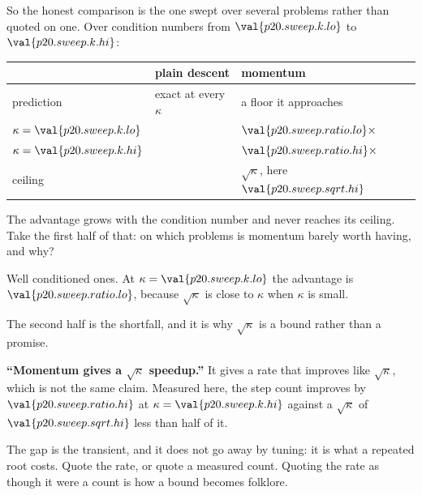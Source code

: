 \begin{fr}
So the honest comparison is the one swept over several problems rather than
quoted on one. Over condition numbers from $\val{p20.sweep.k.lo}$ to
$\val{p20.sweep.k.hi}$:

\begin{center}
\begin{tabular}{lll}
\toprule
& plain descent & momentum \\
\midrule
prediction & exact at every $\kappa$ & a floor it approaches \\
$\kappa = \val{p20.sweep.k.lo}$ & \dash{} & $\val{p20.sweep.ratio.lo}\times$ \\
$\kappa = \val{p20.sweep.k.hi}$ & \dash{} & $\val{p20.sweep.ratio.hi}\times$ \\
ceiling & \dash{} & $\sqrt{\kappa}$, here $\val{p20.sweep.sqrt.hi}$ \\
\bottomrule
\end{tabular}
\end{center}

The advantage grows with the condition number and never reaches its ceiling.
Take the first half of that: on which problems is momentum barely worth
having, and why?
\nextframe
\end{fr}

\begin{fr}
\begin{ansblock}
Well conditioned ones. At $\kappa = \val{p20.sweep.k.lo}$ the advantage is
$\val{p20.sweep.ratio.lo}$, because $\sqrt{\kappa}$ is close to $\kappa$ when
$\kappa$ is small.
\end{ansblock}

The second half is the shortfall, and it is why $\sqrt{\kappa}$ is a bound
rather than a promise.

\begin{trapbox}
\textbf{\enquote{Momentum gives a $\sqrt{\kappa}$ speedup.}} It gives a rate
that improves like $\sqrt{\kappa}$, which is not the same claim. Measured
here, the step count improves by $\val{p20.sweep.ratio.hi}$ at
$\kappa = \val{p20.sweep.k.hi}$ against a $\sqrt{\kappa}$ of
$\val{p20.sweep.sqrt.hi}$ \dash{} less than half of it.

The gap is the transient, and it does not go away by tuning: it is what a
repeated root costs. Quote the rate, or quote a measured count. Quoting the
rate as though it were a count is how a bound becomes folklore.
\end{trapbox}
\end{fr}

